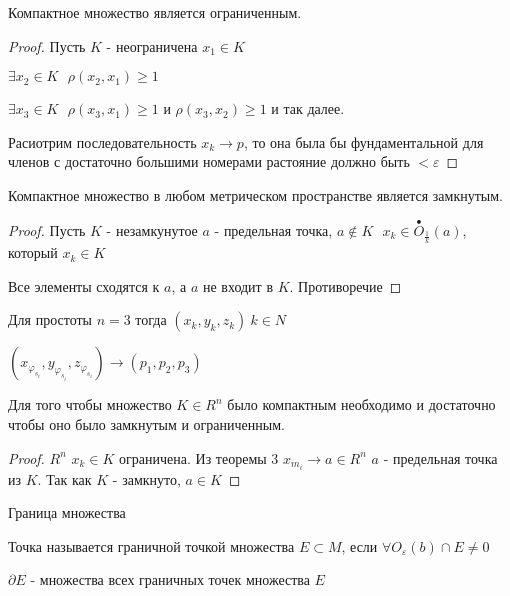 \begin{theorem}
  Компактное множество является ограниченным.
\end{theorem}

\begin{proof}
  Пусть $K$ - неограничена $x_1 \in K$

  $\exists x_2 \in K ~~~ \rho(x_2, x_1) \ge 1$

  $\exists x_3 \in K ~~~ \rho(x_3, x_1) \ge 1$ и $\rho(x_3, x_2) \ge 1$ и так
  далее.

  Расиотрим последовательность $x_k \to p$, то она была бы фундаментальной для
  членов с достаточно большими номерами растояние должно быть $< \varepsilon$
\end{proof}

\begin{theorem}
  Компактное множество в любом метрическом пространстве является замкнутым.
\end{theorem}

\begin{proof}
  Пусть $K$ - незамкунутое $a$ - предельная точка, $a \not\in K ~~~
  x_k \in \stackrel{\bullet}{O}_{\frac{1}{k}}(a)$, который $x_k \in K$

  Все элементы сходятся к $a$, а $a$ не входит в $K$. Противоречие
\end{proof}

\begin{theorem}
  Для простоты $n = 3$ тогда $(x_k, y_k, z_k) ~ k \in N$

  $(x_{\varphi_{s_i}}, y_{\varphi_{s_i}}, z_{\varphi_{s_i}}) \to
  (p_1, p_2, p_3)$
\end{theorem}

\begin{theorem}
  Для того чтобы множество $K \in R^n$ было компактным необходимо и достаточно
  чтобы оно было замкнутым и ограниченным.
\end{theorem}

\begin{proof}
  $R^n$ $x_k \in K$ ограничена. Из теоремы 3 $x_{m_i} \to a \in R^n$ $a$ -
  предельная точка из $K$. Так как $K$ - замкнуто, $a \in K$
\end{proof}

\begin{title}[\Large]
  Граница множества
\end{title}

\begin{define}
  Точка называется граничной точкой множества $E \subset M$, если
  $\forall O_{\varepsilon}(b)\cap E \not= 0$

  $\partial E$ - множества всех граничных точек множества $E$
\end{define}

